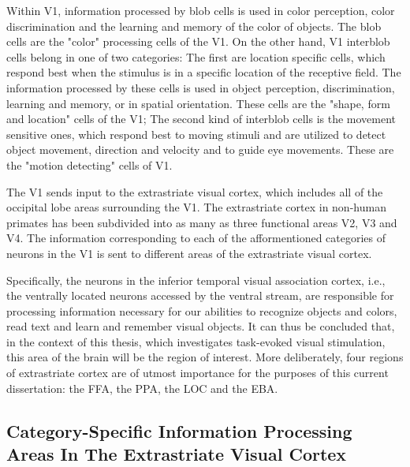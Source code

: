 Within \gls{V1}, information processed by \gls{blob cells} is used in color perception, color discrimination and the learning and memory of the color of objects. The \gls{blob cells} are the "color" processing cells of the \gls{V1}. On the other hand, \gls{V1} \gls{interblob cells} belong in one of two categories: The first are location specific cells, which respond best when the stimulus is in a specific location of the receptive field. The information processed by these cells is used in object perception, discrimination, learning and memory, or in spatial orientation. These cells are the "shape, form and location" cells of the \gls{V1}; The second kind of \gls{interblob cells} is the movement sensitive ones, which respond best to moving stimuli and are utilized to detect object movement, direction and velocity and to guide eye movements. These are the "motion detecting" cells of \gls{V1}.

The \gls{V1} sends input to the extrastriate visual cortex, which includes all of the occipital lobe areas surrounding the \gls{V1}. The extrastriate cortex in non-human primates has been subdivided into as many as three functional areas \gls{V2}, \gls{V3} and \gls{V4}. The information corresponding to each of the afformentioned categories of neurons in the \gls{V1} is sent  to different areas of the extrastriate visual cortex.

Specifically, the neurons in the inferior temporal visual association cortex, i.e., the ventrally located neurons accessed by the ventral stream, are responsible for processing information necessary for our abilities to recognize objects and colors, read text and learn and remember visual objects. It can thus be concluded that, in the context of this thesis, which investigates task-evoked visual stimulation, this area of the brain will be the region of interest. More deliberately, four regions of extrastriate cortex are of utmost importance for the purposes of this current dissertation: the \gls{FFA}, the \gls{PPA}, the \gls{LOC} and the \gls{EBA}.

\subsection{Category-Specific Information Processing Areas In The Extrastriate Visual Cortex}

